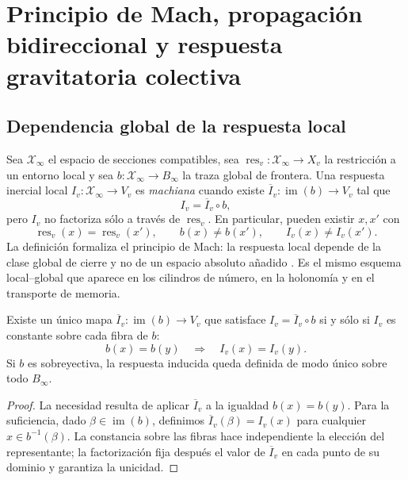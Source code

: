 \section{Principio de Mach, propagación bidireccional y respuesta gravitatoria colectiva}
\label{chap:mach-onda-bidireccional-rev10}

\subsection{Dependencia global de la respuesta local}

Sea \(\mathcal X_\infty\) el espacio de secciones compatibles, sea
\(\operatorname{res}_v:\mathcal X_\infty\to X_v\) la restricción a un
entorno local y sea \(b:\mathcal X_\infty\to B_\infty\) la traza global de
frontera. Una respuesta inercial local \(I_v:\mathcal X_\infty\to V_v\)
es \emph{machiana} cuando existe
\(\overline I_v:\operatorname{im}(b)\to V_v\) tal que
\begin{equation}
 I_v=\overline I_v\circ b,
 \label{eq:factorizacion-mach-rev10}
\end{equation}
pero \(I_v\) no factoriza sólo a través de
\(\operatorname{res}_v\). En particular, pueden existir \(x,x'\) con
\[
 \operatorname{res}_v(x)=\operatorname{res}_v(x'),\qquad
 b(x)\ne b(x'),\qquad I_v(x)\ne I_v(x').
\]
La definición formaliza el principio de Mach: la respuesta local depende de
la clase global de cierre y no de un espacio absoluto añadido
\cite{MachMechanics}. Es el mismo esquema local--global que aparece en los
cilindros de número, en la holonomía y en el transporte de memoria.

\begin{theorem}
\label{thm:criterio-factorizacion-machiana-rev2}
Existe un único mapa
\(\overline I_v:\operatorname{im}(b)\to V_v\) que satisface
\(I_v=\overline I_v\circ b\) si y sólo si \(I_v\) es constante sobre cada
fibra de \(b\):
\[
 b(x)=b(y)\quad\Longrightarrow\quad I_v(x)=I_v(y).
\]
Si \(b\) es sobreyectiva, la respuesta inducida queda definida de modo único
sobre todo \(B_\infty\).
\end{theorem}

\begin{proof}
La necesidad resulta de aplicar \(\overline I_v\) a la igualdad
\(b(x)=b(y)\). Para la suficiencia, dado
\(\beta\in\operatorname{im}(b)\), definimos
\(\overline I_v(\beta)=I_v(x)\) para cualquier \(x\in b^{-1}(\beta)\). La
constancia sobre las fibras hace independiente la elección del representante;
la factorización fija después el valor de \(\overline I_v\) en cada punto de
su dominio y garantiza la unicidad.
\end{proof}

